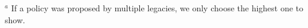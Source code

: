 \documentclass[9pt,twoside,lineno]{pnas-new}
\begin{document}
\begin{table}
\begin{tabular}{lrr}
    \bottomrule
    \end{tabular}

    \footnotesize{$^a$ If a policy was proposed by multiple legacies, we only choose the highest one to show.}
\end{table}


\FloatBarrier




\end{document}
